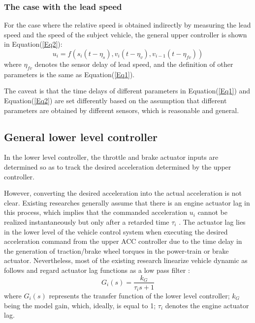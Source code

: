 \documentclass[a4paper]{cas-sc}
\begin{document}
\subsubsection{The case with the lead speed}
\label{Section 2.2.2}

For the case where the relative speed is obtained indirectly by measuring the lead speed and the speed of the subject vehicle, the general upper controller is shown in Equation(\ref{Eq2}):
\begin{equation}
  u_i=f(s_i\left(t-\eta_s\right),v_i\left(t-\eta_v\right), v_{i-1}(t-\eta_{fv}))
  \label{Eq2}
\end{equation}
where $\eta_{fv}$ denotes the sensor delay of lead speed, and the definition of other parameters is the same as Equation(\ref{Eq1}).

The caveat is that the time delays of different parameters in Equation(\ref{Eq1}) and Equation(\ref{Eq2}) are set differently based on the assumption that different parameters are obtained by different sensors, which is reasonable and general.




\subsection{General lower level controller}
\label{Section 2.3}

In the lower level controller, the throttle and brake actuator inputs are determined so as to track the desired acceleration determined by the upper controller.

However, converting the desired acceleration into the actual acceleration is not clear. Existing researches generally assume that there is an engine actuator lag in this process, which implies that the commanded acceleration $u_i$ cannot be realized instantaneously but only after a retarded time $\tau_i$ \citep{Ploeg2011}. The actuator lag lies in the lower level of the vehicle control system when executing the desired acceleration command from the upper ACC controller due to the time delay in the generation of traction/brake wheel torques in the power-train or brake actuator. Nevertheless, most of the existing research linearize vehicle dynamic as follows and regard actuator lag functions as a low pass filter \citep{Wang2018a,Naus2010}:
\begin{equation}
  G_i(s)=\frac{k_G}{\tau_is+1}
  \label{Eq3}
\end{equation}
where $G_i(s)$ represents the transfer function of the lower level controller; $k_G$ being the model gain, which, ideally, is equal to 1; $\tau_i$ denotes the engine actuator lag.
\end{document}
